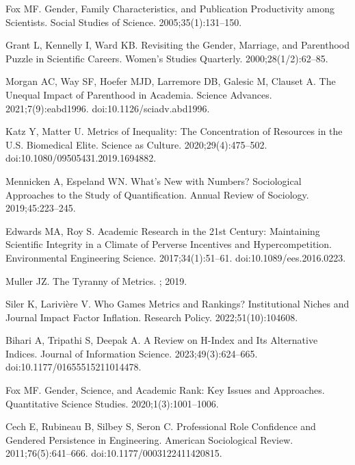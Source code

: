 \documentclass[
  10pt,
  letterpaper,
]{article}
\begin{document}
\begin{thebibliography}{10}
Fox MF.
\newblock Gender, Family Characteristics, and Publication Productivity among Scientists.
\newblock Social Studies of Science. 2005;35(1):131--150.

Grant L, Kennelly I, Ward KB.
\newblock Revisiting the Gender, Marriage, and Parenthood Puzzle in Scientific Careers.
\newblock Women's Studies Quarterly. 2000;28(1/2):62--85.

Morgan AC, Way SF, Hoefer MJD, Larremore DB, Galesic M, Clauset A.
\newblock The Unequal Impact of Parenthood in Academia.
\newblock Science Advances. 2021;7(9):eabd1996.
\newblock doi:{10.1126/sciadv.abd1996}.

Katz Y, Matter U.
\newblock Metrics of {{Inequality}}: {{The Concentration}} of {{Resources}} in the {{U}}.{{S}}. {{Biomedical Elite}}.
\newblock Science as Culture. 2020;29(4):475--502.
\newblock doi:{10.1080/09505431.2019.1694882}.

Mennicken A, Espeland WN.
\newblock What's New with Numbers? {{Sociological}} Approaches to the Study of Quantification.
\newblock Annual Review of Sociology. 2019;45:223--245.

Edwards MA, Roy S.
\newblock Academic {{Research}} in the 21st {{Century}}: {{Maintaining Scientific Integrity}} in a {{Climate}} of {{Perverse Incentives}} and {{Hypercompetition}}.
\newblock Environmental Engineering Science. 2017;34(1):51--61.
\newblock doi:{10.1089/ees.2016.0223}.

Muller JZ.
\newblock The Tyranny of Metrics.
; 2019.

Siler K, Larivi{\`e}re V.
\newblock Who Games Metrics and Rankings? {{Institutional}} Niches and Journal Impact Factor Inflation.
\newblock Research Policy. 2022;51(10):104608.

Bihari A, Tripathi S, Deepak A.
\newblock A Review on H-Index and Its Alternative Indices.
\newblock Journal of Information Science. 2023;49(3):624--665.
\newblock doi:{10.1177/01655515211014478}.

Fox MF.
\newblock Gender, Science, and Academic Rank: {{Key}} Issues and Approaches.
\newblock Quantitative Science Studies. 2020;1(3):1001--1006.

Cech E, Rubineau B, Silbey S, Seron C.
\newblock Professional {{Role Confidence}} and {{Gendered Persistence}} in {{Engineering}}.
\newblock American Sociological Review. 2011;76(5):641--666.
\newblock doi:{10.1177/0003122411420815}.


\end{thebibliography}
\end{document}
